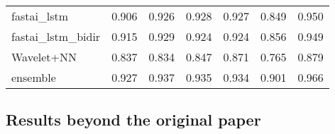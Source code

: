 \begin{table}[h]
\begin{tabular}{lllllll}
fastai\_lstm           & \cellcolor{green!25} 0.906 & \cellcolor{green!25} 0.926 & \cellcolor{green!25} 0.928 & \cellcolor{green!25} 0.927 & \cellcolor{green!25} 0.849 & \cellcolor{green!25} 0.950 \\
fastai\_lstm\_bidir    & \cellcolor{green!25} 0.915 & \cellcolor{green!25} 0.929 & \cellcolor{green!25} 0.924 & \cellcolor{green!25} 0.924 & \cellcolor{red!25} 0.856   & \cellcolor{green!25} 0.949 \\
Wavelet+NN             & \cellcolor{green!25} 0.837 & \cellcolor{red!25} 0.834   & \cellcolor{green!25} 0.847 & \cellcolor{green!25} 0.871 & \cellcolor{green!25} 0.765 & \cellcolor{green!25} 0.879 \\
ensemble               & \cellcolor{green!25} 0.927 & \cellcolor{green!25} 0.937 & \cellcolor{green!25} 0.935 & \cellcolor{green!25} 0.934 & \cellcolor{green!25} 0.901 & \cellcolor{green!25} 0.966 \\\hline                            
\end{tabular}
\label{tab:rep_main}
\end{table}



\subsection{Results beyond the original paper}

